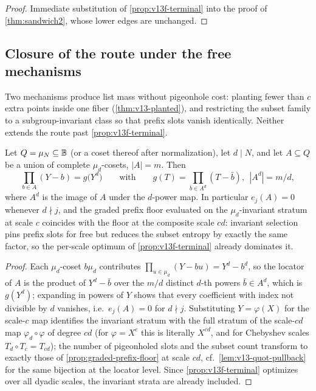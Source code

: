 \begin{proof}
Immediate substitution of \cref{prop:v13f-terminal} into the proof of \cref{thm:sandwich2}, whose lower edges are unchanged.
\end{proof}

\subsection{Closure of the route under the free mechanisms}

Two mechanisms produce list mass without pigeonhole cost: planting fewer than $c$ extra points inside one fiber \textup(\cref{thm:v13-planted}\textup), and restricting the subset family to a subgroup-invariant class so that prefix slots vanish identically.  Neither extends the route past \cref{prop:v13f-terminal}.

\begin{lemma}\label{lem:v13f-scale-absorption}
Let $Q=\mu_N\subseteq\mathbb B$ \textup(or a coset thereof after normalization\textup), let $d\mid N$, and let $A\subseteq Q$ be a union of complete $\mu_d$-cosets, $|A|=m$.  Then
\[
        \prod_{b\in A}(Y-b)=g\bigl(Y^d\bigr)
        \qquad\text{with}\qquad
        g(T)=\prod_{\bar b\in A^d}(T-\bar b),\ \ |A^d|=m/d ,
\]
where $A^d$ is the image of $A$ under the $d$-power map.  In particular $e_j(A)=0$ whenever $d\nmid j$, and the graded prefix floor evaluated on the $\mu_d$-invariant stratum at scale $c$ coincides with the floor at the composite scale $cd$: invariant selection pins prefix slots for free but reduces the subset entropy by exactly the same factor, so the per-scale optimum of \cref{prop:v13f-terminal} already dominates it.
\end{lemma}

\begin{proof}
Each $\mu_d$-coset $b\mu_d$ contributes $\prod_{u\in\mu_d}(Y-bu)=Y^d-b^d$, so the locator of $A$ is the product of $Y^d-\bar b$ over the $m/d$ distinct $d$-th powers $\bar b\in A^d$, which is $g(Y^d)$; expanding in powers of $Y$ shows that every coefficient with index not divisible by $d$ vanishes, i.e.\ $e_j(A)=0$ for $d\nmid j$.  Substituting $Y=\varphi(X)$ for the scale-$c$ map identifies the invariant stratum with the full stratum of the scale-$cd$ map $\varphi_d\circ\varphi$ of degree $cd$ \textup(for $\varphi=X^c$ this is literally $X^{cd}$, and for Chebyshev scales $T_d\circ T_c=T_{cd}$\textup); the number of pigeonholed slots and the subset count transform to exactly those of \cref{prop:graded-prefix-floor} at scale $cd$, cf.\ \cref{lem:v13-quot-pullback} for the same bijection at the locator level.  Since \cref{prop:v13f-terminal} optimizes over all dyadic scales, the invariant strata are already included.
\end{proof}

